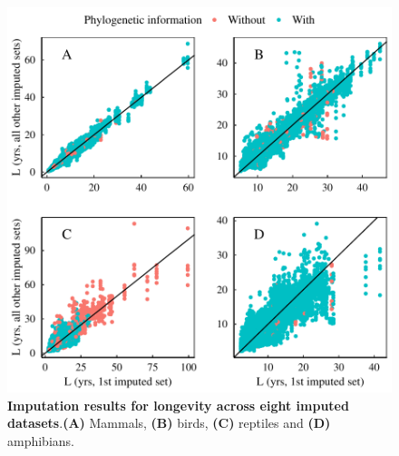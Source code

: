 \documentclass[11pt]{article}
\begin{document}
\begin{figure}[h!]
\centering
\includegraphics[scale=0.6]{figures/Congruence_continuous_traits/LG}
\caption[Imputation results for longevity across eight imputed datasets]{\textbf{Imputation results for longevity across eight imputed datasets}.\textbf{(A)} Mammals, \textbf{(B)} birds, \textbf{(C)} reptiles and \textbf{(D)} amphibians.}
\label{congruenceLG}
\end{figure}
\end{document}

